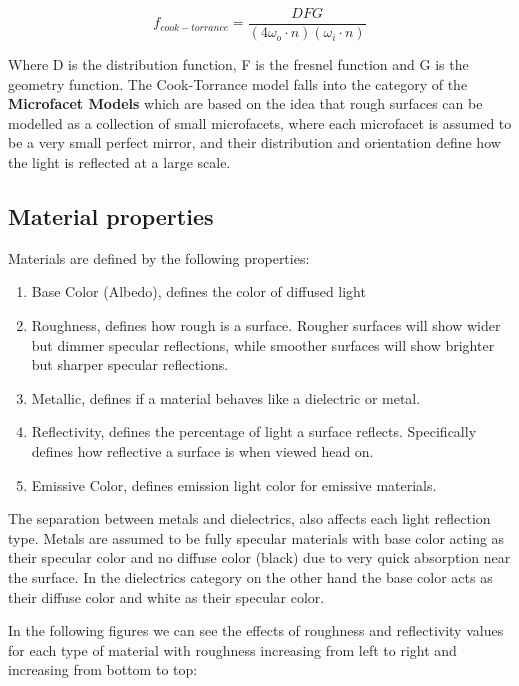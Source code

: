 $$f_{cook-torrance} = \frac{DFG}{(4 \omega_o \cdot n)(\omega_i \cdot n)}$$

Where D is the distribution function, F is the fresnel function and G is the geometry function.
The Cook-Torrance model falls into the category of the \textbf{Microfacet Models} which are based on the idea
that rough surfaces can be modelled as a collection of small microfacets, where each microfacet is assumed to be a very small perfect mirror,
and their distribution and orientation define how the light is reflected at a large scale.

\subsection{Material properties}
Materials are defined by the following properties:

\begin{enumerate}
    \item Base Color (Albedo), defines the color of diffused light
    \item Roughness, defines how rough is a surface. Rougher surfaces will show wider but dimmer specular reflections, while smoother
        surfaces will show brighter but sharper specular reflections.
    \item Metallic, defines if a material behaves like a dielectric or metal.
    \item Reflectivity, defines the percentage of light a surface reflects. Specifically defines how reflective a surface is when viewed
        head on.
    \item Emissive Color, defines emission light color for emissive materials.
\end{enumerate}

The separation between metals and dielectrics, also affects each light reflection type.
Metals are assumed to be fully specular materials with base color acting as their specular color and no diffuse color (black)
due to very quick absorption near the surface. In the dielectrics category on the other hand the base color acts as their diffuse
color and white as their specular color.

In the following figures we can see the effects of roughness and reflectivity values for each type of material with
roughness increasing from left to right and increasing from bottom to top:

